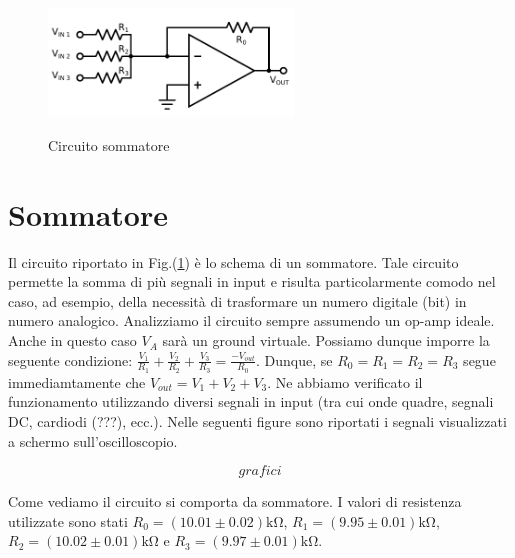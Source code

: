 \begin{figure}
	\caption{Circuito sommatore}
	\includegraphics[width=65mm]{ccsum.pdf}
	\label{fig:ccsum}
\end{figure}

\section{Sommatore}

Il circuito riportato in Fig.(\ref{}) è lo schema di un sommatore.
Tale circuito permette la somma di più segnali in input e risulta particolarmente comodo nel caso, ad esempio, della necessità di trasformare un numero digitale (bit) in numero analogico.
Analizziamo il circuito sempre assumendo un op-amp ideale.
Anche in questo caso $V_A$ sarà un ground virtuale.
Possiamo dunque imporre la seguente condizione: $\frac{V_1}{R_1}+\frac{V_2}{R_2}+\frac{V_3}{R_3}=\frac{-V_{out}}{R_0}$.
Dunque, se $R_0=R_1=R_2=R_3$ segue immediamtamente che $V_{out}=V_1+V_2+V_3$.
Ne abbiamo verificato il funzionamento utilizzando diversi segnali in input (tra cui onde quadre, segnali DC, cardiodi (???), ecc.).
Nelle seguenti figure sono riportati i segnali visualizzati a schermo sull'oscilloscopio.

$$grafici$$

Come vediamo il circuito si comporta da sommatore. I valori di resistenza utilizzate sono stati $R_0=(10.01\pm0.02)\si{\kilo\ohm}$, $R_1=(9.95\pm0.01)\si{\kilo\ohm}$, $R_2=(10.02\pm 0.01)\si{\kilo\ohm}$ e $R_3=(9.97\pm0.01)\si{\kilo\ohm}$.
